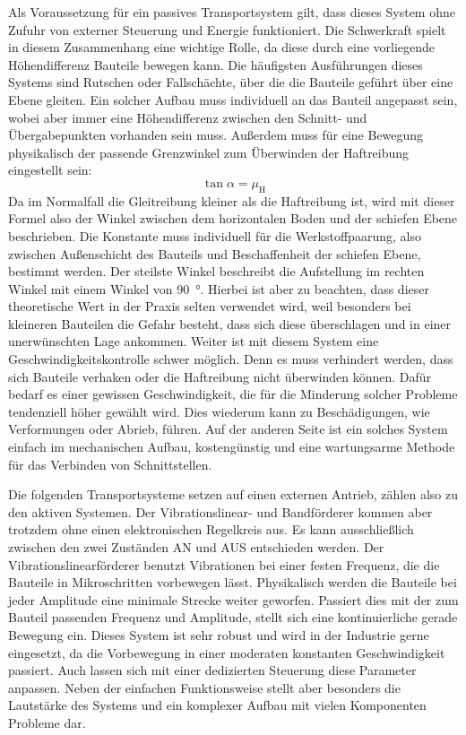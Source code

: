 Als Voraussetzung für ein passives Transportsystem gilt, dass dieses System ohne Zufuhr von externer Steuerung und Energie
funktioniert. Die Schwerkraft spielt in diesem Zusammenhang eine wichtige Rolle, da diese durch eine vorliegende Höhendifferenz
Bauteile bewegen kann. Die häufigsten Ausführungen dieses Systems sind Rutschen oder Fallschächte, über die die Bauteile geführt
über eine Ebene gleiten. Ein solcher Aufbau muss individuell an das Bauteil angepasst sein, wobei aber immer eine Höhendifferenz
zwischen den Schnitt- und Übergabepunkten vorhanden sein muss. Außerdem muss für eine Bewegung physikalisch der passende Grenzwinkel
zum Überwinden der Haftreibung eingestellt sein:
\begin{equation}\label{eq:Grenzwinkel}
  \tan \alpha = \mu_\mathrm{H}
\end{equation}
Da im Normalfall die Gleitreibung kleiner als die Haftreibung ist, wird mit dieser Formel also der Winkel zwischen dem horizontalen
Boden und der schiefen Ebene beschrieben. Die Konstante muss individuell für die Werkstoffpaarung, also zwischen Außenschicht des
Bauteils und Beschaffenheit der schiefen Ebene, bestimmt werden. Der steilste Winkel beschreibt die Aufstellung im rechten Winkel mit einem Winkel von \qty{90}{\degree}.
Hierbei ist aber zu beachten, dass dieser theoretische Wert in der Praxis selten verwendet wird, weil besonders bei kleineren Bauteilen
die Gefahr besteht, dass sich diese überschlagen und in einer unerwünschten Lage ankommen. Weiter ist mit diesem System eine
Geschwindigkeitskontrolle schwer möglich. Denn es muss verhindert werden, dass sich Bauteile verhaken oder die Haftreibung nicht überwinden können.
Dafür bedarf es einer gewissen Geschwindigkeit, die für die Minderung solcher Probleme tendenziell höher gewählt wird. Dies wiederum kann
zu Beschädigungen, wie Verformungen oder Abrieb, führen. Auf der anderen Seite ist ein solches System einfach im mechanischen Aufbau,
kostengünstig und eine wartungsarme Methode für das Verbinden von Schnittstellen.

Die folgenden Transportsysteme setzen auf einen externen Antrieb, zählen also zu den aktiven Systemen. Der Vibrationslinear-
und Bandförderer kommen aber trotzdem ohne einen elektronischen Regelkreis aus. Es kann ausschließlich zwischen den zwei Zuständen
AN und AUS entschieden werden. Der Vibrationslinearförderer benutzt Vibrationen bei einer festen Frequenz, die die Bauteile in
Mikroschritten vorbewegen lässt. Physikalisch werden die Bauteile bei jeder Amplitude eine minimale Strecke weiter geworfen. Passiert dies
mit der zum Bauteil passenden Frequenz und Amplitude, stellt sich eine kontinuierliche gerade Bewegung ein. Dieses System ist sehr
robust und wird in der Industrie gerne eingesetzt, da die Vorbewegung in einer moderaten konstanten Geschwindigkeit passiert. Auch lassen sich
mit einer dedizierten Steuerung diese Parameter anpassen. Neben der einfachen Funktionsweise stellt aber
besonders die Lautstärke des Systems und ein komplexer Aufbau mit vielen Komponenten Probleme dar.

